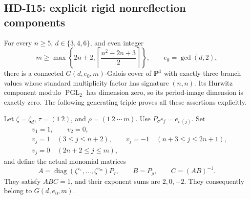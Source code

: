 \subsection{HD-I15: explicit rigid nonreflection components}
\label{sec:HD-I15}

For every $n\geq5$, $d\in\{3,4,6\}$, and even integer
\[
 m\geq\max\left\{2n+2,
          \left\lceil\frac{n^2-2n+3}{2}\right\rceil\right\},
 \qquad e_0=\gcd(d,2),
\]
there is a connected $G(d,e_0,m)$-Galois cover of $\mathbf P^1$ with
exactly three branch values whose standard multiplicity factor has
signature $(n,n)$.  Its Hurwitz component modulo $\operatorname{PGL}_2$
has dimension zero, so its period-image dimension is exactly zero.
The following generating triple proves all these assertions explicitly.

Let $\zeta=\zeta_d$, $\tau=(1\ 2)$, and $\rho=(1\ 2\ \cdots\ m)$.
Use $P_\sigma e_j=e_{\sigma(j)}$.  Set
\[
\begin{split}
 &v_1=1,\qquad v_2=0,\\
 &v_j=1\quad(3\leq j\leq n+2),\qquad
 v_j=-1\quad(n+3\leq j\leq2n+1),\\
 &v_j=0\quad(2n+2\leq j\leq m),
\end{split}
\]
and define the actual monomial matrices
\begin{equation}
 A=\operatorname{diag}(\zeta^{v_1},\ldots,\zeta^{v_m})P_\tau,
 \qquad B=P_\rho,\qquad C=(AB)^{-1}.              \tag{I15.1}
\end{equation}
They satisfy $ABC=1$, and their exponent sums are $2,0,-2$.
They consequently belong to $G(d,e_0,m)$.

